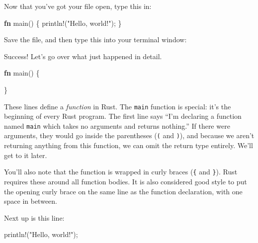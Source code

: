\documentclass[a4paper,]{book}
\newenvironment{Shaded}{\begin{snugshade}}{\end{snugshade}}
\newcommand{\KeywordTok}[1]{\textcolor[rgb]{0.13,0.29,0.53}{\textbf{{#1}}}}
\newcommand{\StringTok}[1]{\textcolor[rgb]{0.31,0.60,0.02}{{#1}}}
\newcommand{\CommentTok}[1]{\textcolor[rgb]{0.56,0.35,0.01}{\textit{{#1}}}}
\newcommand{\OtherTok}[1]{\textcolor[rgb]{0.56,0.35,0.01}{{#1}}}
\newcommand{\NormalTok}[1]{{#1}}
\begin{document}
Now that you've got your file open, type this in:

\begin{Shaded}
\begin{Highlighting}[]
\KeywordTok{fn} \NormalTok{main() \{}
    \OtherTok{println!}\NormalTok{(}\StringTok{"Hello, world!"}\NormalTok{);}
\NormalTok{\}}
\end{Highlighting}
\end{Shaded}

Save the file, and then type this into your terminal window:

\begin{Shaded}
\end{Shaded}

Success! Let's go over what just happened in detail.

\begin{Shaded}
\begin{Highlighting}[]
\KeywordTok{fn} \NormalTok{main() \{}

\NormalTok{\}}
\end{Highlighting}
\end{Shaded}

These lines define a \emph{function} in Rust. The \texttt{main} function
is special: it's the beginning of every Rust program. The first line
says ``I'm declaring a function named \texttt{main} which takes no
arguments and returns nothing.'' If there were arguments, they would go
inside the parentheses (\texttt{(} and \texttt{)}), and because we
aren't returning anything from this function, we can omit the return
type entirely. We'll get to it later.

You'll also note that the function is wrapped in curly braces
(\texttt{\{} and \texttt{\}}). Rust requires these around all function
bodies. It is also considered good style to put the opening curly brace
on the same line as the function declaration, with one space in between.

Next up is this line:

\begin{Shaded}
\begin{Highlighting}[]
    \OtherTok{println!}\NormalTok{(}\StringTok{"Hello, world!"}\NormalTok{);}
\end{Highlighting}
\end{Shaded}
\end{document}
